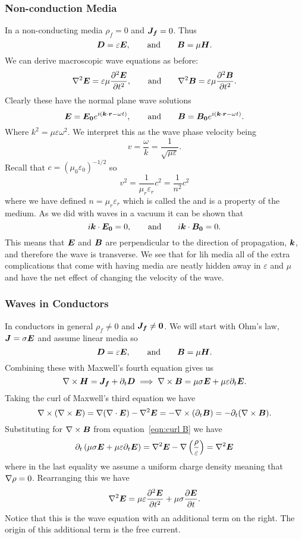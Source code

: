     \subsubsection{Non-conduction Media}
    In a non-conducting media \(\rho_f = 0\) and \(\bm{J_f} = 0\).
    Thus
    \[\bm{D} = \varepsilon\bm{E}, \qquad\text{and}\qquad \bm{B} = \mu\bm{H}.\]
    We can derive macroscopic wave equations as before:
    \[\nabla^2\bm{E} = \varepsilon\mu \pdv[2]{\bm{E}}{t}, \qquad\text{and}\qquad \nabla^2\bm{B} = \varepsilon\mu\pdv[2]{\bm{B}}{t}.\]
    Clearly these have the normal plane wave solutions
    \[\bm{E} = \bm{E_0}e^{i(\bm{k}\cdot\bm{r} - \omega t)}, \qquad\text{and}\qquad \bm{B} = \bm{B_0}e^{i(\bm{k}\cdot\bm{r} - \omega t)}.\]
    Where \(k^2 = \mu\varepsilon\omega^2\).
    We interpret this as the wave phase velocity being
    \[v = \frac{\omega}{k} = \frac{1}{\sqrt{\mu\varepsilon}}.\]
    Recall that \(c = (\mu_0\varepsilon_0)^{-1/2}\) so
    \[v^2 = \frac{1}{\mu_r\varepsilon_r}c^2 = \frac{1}{n^2}c^2\]
    where we have defined \(n = \mu_r\varepsilon_r\) which is called the  and is a property of the medium.
    As we did with waves in a vacuum it can be shown that
    \[i\bm{k}\cdot\bm{E_0} = 0, \qquad\text{and}\qquad i\bm{k}\cdot\bm{B_0} = 0.\]
    This means that \(\bm{E}\) and \(\bm{B}\) are perpendicular to the direction of propagation, \(\bm{k}\), and therefore the wave is transverse.
    We see that for \gls{lih} media all of the extra complications that come with having media are neatly hidden away in \(\varepsilon\) and \(\mu\) and have the net effect of changing the velocity of the wave.
    
    \subsubsection{Waves in Conductors}
    In conductors in general \(\rho_f \ne 0\) and \(\bm{J_f} \ne \bm{0}\).
    We will start with Ohm's law, \(\bm{J} = \sigma\bm{E}\) and assume linear media so
    \[\bm{D} = \varepsilon\bm{E}, \qquad\text{and}\qquad \bm{B} = \mu\bm{H}.\]
    Combining these with Maxwell's fourth equation gives us
    \begin{equation}\label{eqn:curl B}
        \nabla\times\bm{H} = \bm{J_f} + \partial_t\bm{D} \implies \nabla\times\bm{B} = \mu\sigma\bm{E} + \mu\varepsilon\partial_t\bm{E}.
    \end{equation}
    Taking the curl of Maxwell's third equation we have
    \[\nabla\times(\nabla\times\bm{E}) = \nabla(\nabla\cdot\bm{E}) - \nabla^2\bm{E} = -\nabla\times(\partial_t\bm{B}) = -\partial_t(\nabla\times\bm{B}).\]
    Substituting for \(\nabla\times\bm{B}\) from equation~\ref{eqn:curl B} we have
    \[\partial_t\left(\mu\sigma\bm{E} + \mu\varepsilon\partial_t\bm{E}\right) = \nabla^2\bm{E} - \nabla\left(\frac{\rho}{\varepsilon}\right) = \nabla^2\bm{E}\]
    where in the last equality we assume a uniform charge density meaning that \(\nabla\rho = 0\).
    Rearranging this we have
    \[\nabla^2\bm{E} = \mu\varepsilon\pdv[2]{\bm{E}}{t} + \mu\sigma\pdv{\bm{E}}{t}.\]
    Notice that this is the wave equation with an additional term on the right.
    The origin of this additional term is the free current.
    
